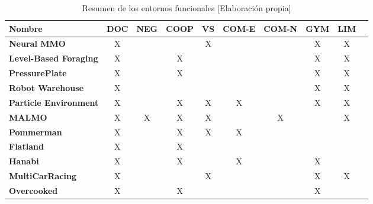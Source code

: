 \begin{table}[h]
	\begin{center}
		\begin{tabular}{| l | c | c | c | c | c | c | c | c | c |}
			\hline
			\textbf{Nombre}               & \textbf{DOC} & \textbf{NEG} & \textbf{COOP} & \textbf{VS} & \textbf{COM-E} & \textbf{COM-N} & \textbf{GYM} & \textbf{LIM} \\ \hline
			\textbf{Neural MMO}           & X            &              &               & X           &                &                & X            & X            \\
			\textbf{Level-Based Foraging} & X            &              & X             &             &                &                & X            & X            \\
			\textbf{PressurePlate}        & X            &              & X             &             &                &                & X            & X            \\
			\textbf{Robot Warehouse}      & X            &              &               &             &                &                & X            & X            \\
			\textbf{Particle Environment} & X            &              & X             & X           & X              &                & X            & X            \\
			\textbf{MALMO}                & X            & X            & X             & X           &               &  X             &             & X            \\
			\textbf{Pommerman}            & X            &              & X             & X           & X              &                &             &              \\
			\textbf{Flatland}             & X            &              & X             &             &                &                &              &              \\
			\textbf{Hanabi}               & X            &              & X             &             & X              &                & X            &              \\
			\textbf{MultiCarRacing}       & X            &              &               & X           &                &                & X            & X            \\
			\textbf{Overcooked}           & X            &              & X             &             &                &                & X            &              \\ \hline
		\end{tabular}
		\caption{Resumen de los entornos funcionales [Elaboración propia]}
		\label{tab:funcionales}
	\end{center}
\end{table}

